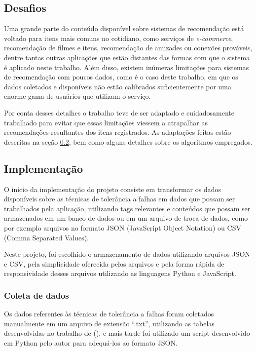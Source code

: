 \documentclass[
	12pt,				%
	oneside,			%
	a4paper,			%
	chapter=TITLE,		%
	english,			%
	french,				%
	spanish,			%
	brazil				%
	]{abntex2}
\begin{document}
\subsection{Desafios}

Uma grande parte do conteúdo disponível sobre sistemas de recomendação está voltado para itens mais comuns no cotidiano, como serviços de \emph{e-commerce}, recomendação de filmes e itens, recomendação de amizades ou conexões prováveis, dentre tantas outras aplicações que estão distantes das formas com que o sistema é aplicado neste trabalho. Além disso, existem inúmeras limitações para sistemas de recomendação com poucos dados, como é o caso deste trabalho, em que os dados coletados e disponíveis não estão calibrados suficientemente por uma enorme gama de usuários que utilizam o serviço.

Por conta desses detalhes o trabalho teve de ser adaptado e cuidadosamente trabalhado para evitar que essas limitações viessem a atrapalhar as recomendações resultantes dos itens registrados. As adaptações feitas estão descritas na seção \ref{sec_imp}, bem como alguns detalhes sobre os algoritmos empregados.

\subsection{Implementação}\label{sec_imp}

O início da implementação do projeto consiste em transformar os dados disponíveis sobre as técnicas de tolerância a falhas em dados que possam ser trabalhados pela aplicação, utilizando tags relevantes e conteúdos que possam ser armazenados em um banco de dados ou em um arquivo de troca de dados, como por exemplo arquivos no formato JSON (JavaScript Object Notation) ou CSV (Comma Separated Values).

Neste projeto, foi escolhido o armazenamento de dados utilizando arquivos JSON e CSV, pela simplicidade oferecida pelos arquivos e pela forma rápida de responsividade desses arquivos utilizando as linguagens Python e JavaScript.

\subsubsection{Coleta de dados}\label{sec_coleta}

Os dados referentes às técnicas de tolerância a falhas foram coletados manualmente em um arquivo de extensão ``.txt'', utilizando as tabelas desenvolvidas no trabalho de \citeauthor{andrade2019taxonomia} (\citeyear{andrade2019taxonomia}), e mais tarde foi utilizado um script desenvolvido em Python pelo autor para adequá-los ao formato JSON.
\end{document}
